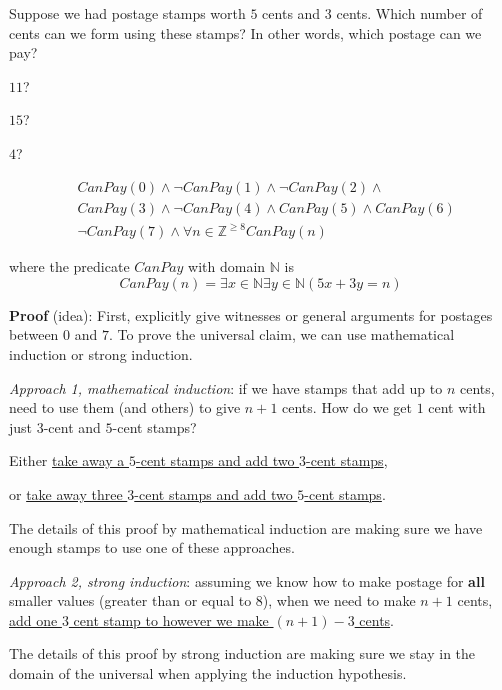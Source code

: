 
Suppose we had postage stamps worth $5$ cents and $3$ cents.
Which number of cents can we form using these stamps?
In other words, which postage can we pay?

$11$? 

$15$? 


$4$?



\begin{align*}
    &CanPay(0) \land \lnot CanPay(1) \land \lnot CanPay(2) \land \\
    &CanPay(3) \land \lnot CanPay(4) \land CanPay(5) \land CanPay(6) \\
    &\lnot CanPay(7) \land \forall n \in \mathbb{Z}^{\geq 8} CanPay(n)
\end{align*}

where the predicate $CanPay$ with domain $\mathbb{N}$ is
\[
    CanPay(n) = \exists x \in \mathbb{N} \exists y \in \mathbb{N}  ( 5x+3y = n)
\]


{\bf Proof} (idea): First, explicitly give witnesses or general arguments
for postages between $0$ and $7$. 
To prove the universal claim, we can use mathematical induction or strong induction.

{\it Approach 1, mathematical induction}: if we have
stamps that add up to $n$ cents, need to use them (and others)
to give $n+1$ cents. How do we get $1$ cent with just $3$-cent
and $5$-cent stamps?

\vspace{-10pt}
Either \underline{take away a $5$-cent stamps and add two $3$-cent stamps},

\vspace{-10pt}
or \underline{take away three $3$-cent stamps and add two $5$-cent stamps}.

\vspace{-10pt}
The details of this proof by mathematical induction
are making sure we have enough 
stamps to use one of these approaches.

{\it Approach 2, strong induction}: assuming we know how to make postage
for {\bf all} smaller values (greater than or equal to $8$), when
we need to make $n+1$ cents, \underline{add one $3$ cent stamp to 
however we make $(n+1) - 3$ cents}.

\vspace{-10pt}
The details of this proof by strong induction are making sure we 
stay in the domain of the universal when applying the induction hypothesis.
